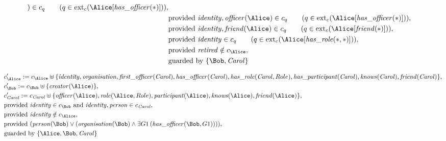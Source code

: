 \begin{align*}
)
 \in c_
q
 \qquad (
q \in 
\mathrm{ext}_c(
\Alice
[
\mathit{\detokenize{
has_officer
}}
(
\ast
)
]
)
)
,\\
&
\text{provided } 
\mathit{\detokenize{
identity
}}
,
\mathit{\detokenize{
officer
}}
(
\Alice
)
 \in c_
q
 \qquad (
q \in 
\mathrm{ext}_c(
\Alice
[
\mathit{\detokenize{
has_officer
}}
(
\ast
)
]
)
)
,\\
&
\text{provided } 
\mathit{\detokenize{
identity
}}
,
\mathit{\detokenize{
friend
}}
(
\Alice
)
 \in c_
q
 \qquad (
q \in 
\mathrm{ext}_c(
\Alice
[
\mathit{\detokenize{
friend
}}
(
\ast
)
]
)
)
,\\
&
\text{provided } 
\mathit{\detokenize{
identity
}}
 \in c_
q
 \qquad (
q \in 
\mathrm{ext}_c(
\Alice
[
\mathit{\detokenize{
has_role
}}
(
\ast
,
\ast
)
]
)
)
,\\
&
\text{provided } 
\mathit{\detokenize{
retired
}}
 \notin c_
{
\Alice
}
,\\
&
\text{guarded by } \{
\Bob
,
\mathit{Carol}
\}
\end{align*}

\begin{align*}
&
c'_
{
\Alice
}
 := 
c_
{
\Alice
}
 \uplus 
\{
\mathit{\detokenize{
identity
}}
,
\mathit{\detokenize{
organisation
}}
,
\mathit{\detokenize{
first_officer
}}
(
\mathit{Carol}
)
,
\mathit{\detokenize{
has_officer
}}
(
\mathit{Carol}
)
,
\mathit{\detokenize{
has_role
}}
(
\mathit{Carol}
,
Role
)
,
\mathit{\detokenize{
has_participant
}}
(
\mathit{Carol}
)
,
\mathit{\detokenize{
knows
}}
(
\mathit{Carol}
)
,
\mathit{\detokenize{
friend
}}
(
\mathit{Carol}
)
\}
,\\
&
c'_
{
\Bob
}
 := 
c_
{
\Bob
}
 \uplus 
\{
\mathit{\detokenize{
creator
}}
(
\Alice
)
\}
,\\
&
c'_
{
\mathit{Carol}
}
 := 
c_
{
\mathit{Carol}
}
 \uplus 
\{
\mathit{\detokenize{
officer
}}
(
\Alice
)
,
\mathit{\detokenize{
role
}}
(
\Alice
,
Role
)
,
\mathit{\detokenize{
participant
}}
(
\Alice
)
,
\mathit{\detokenize{
knows
}}
(
\Alice
)
,
\mathit{\detokenize{
friend
}}
(
\Alice
)
\}
,\\
&
\text{provided } 
\mathit{\detokenize{
identity
}}
 \in c_
{
\Bob
}
 \text{ and } 
\mathit{\detokenize{
identity
}}
,
\mathit{\detokenize{
person
}}
 \in c_
{
\mathit{Carol}
}
,\\
&
\text{provided } 
\mathit{\detokenize{
identity
}}
 \notin c_
{
\Alice
}
,\\
&
\text{provided } 
(
\mathit{\detokenize{
person
}}
(
\Bob
)
\lor
(
\mathit{\detokenize{
organisation
}}
(
\Bob
)
\land
\exists 
G1
\,(
\mathit{\detokenize{
has_officer
}}
(
\Bob
,
G1
)
)
)
)
,\\
&
\text{guarded by } \{
\Alice
,
\Bob
,
\mathit{Carol}
\}
\end{align*}
